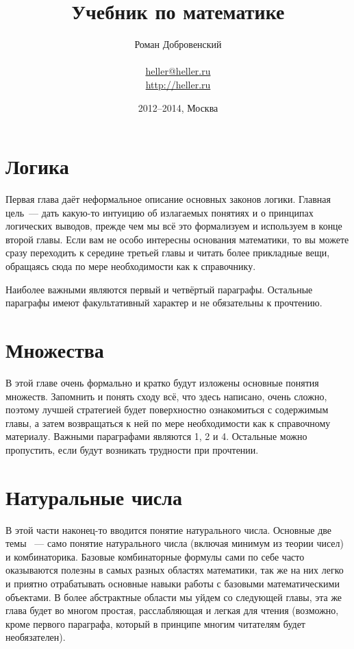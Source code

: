 \documentclass[a5paper,10pt,pagesize,DIV=classic]{scrbook}
\theoremstyle{plain}
\theoremstyle{definition}
\begin{document}
\title{Учебник по математике}
\author{Роман Добровенский\\ \\ \url{heller@heller.ru}\\ \url{http://heller.ru}}
\date{2012--2014, Москва}
\maketitle

\tableofcontents



\chapter{Логика}
Первая глава даёт неформальное описание основных законов логики. Главная цель~--- дать какую-то интуицию об излагаемых понятиях и о принципах логических выводов, прежде чем мы всё это формализуем и используем в конце второй главы. Если вам не особо интересны основания математики, то вы можете сразу переходить к середине третьей главы и читать более прикладные вещи, обращаясь сюда по мере необходимости как к справочнику.

Наиболее важными являются первый и четвёртый параграфы. Остальные параграфы имеют факультативный характер и не обязательны к прочтению.







%
%




\chapter{Множества}
В этой главе очень формально и кратко будут изложены основные понятия множеств. Запомнить и понять сходу всё, что здесь написано, очень сложно, поэтому лучшей стратегией будет поверхностно ознакомиться с содержимым главы, а затем возвращаться к ней по мере необходимости как к справочному материалу. Важными параграфами являются 1, 2 и 4. Остальные можно пропустить, если будут возникать трудности при прочтении.






%



\chapter{Натуральные числа}
В этой части наконец-то вводится понятие натурального числа. Основные две темы ~--- само понятие натурального числа (включая минимум из теории чисел) и комбинаторика. Базовые комбинаторные формулы сами по себе часто оказываются полезны в самых разных областях математики, так же на них легко и приятно отрабатывать основные навыки работы с базовыми математическими объектами. В более абстрактные области мы уйдем со следующей главы, эта же глава будет во многом простая, расслабляющая и легкая для чтения (возможно, кроме первого параграфа, который в принципе многим читателям будет необязателен).







%

\end{document}
